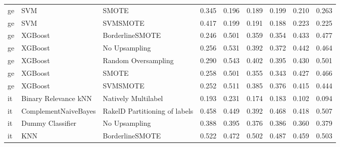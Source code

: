 \begin{tabular}{lllllllll}
      ge &                             SVM &                         SMOTE & 0.345 &                     0.196 &                 0.189 &                  0.199 &                                   0.210 &     0.263 \\
      ge &                             SVM &                      SVMSMOTE & 0.417 &                     0.199 &                 0.191 &                  0.188 &                                   0.223 &     0.225 \\
      ge &                         XGBoost &               BorderlineSMOTE & 0.246 &                     0.501 &                 0.359 &                  0.354 &                                   0.433 &     0.477 \\
      ge &                         XGBoost &                 No Upsampling & 0.256 &                     0.531 &                 0.392 &                  0.372 &                                   0.442 &     0.464 \\
      ge &                         XGBoost &           Random Oversampling & 0.290 &                     0.543 &                 0.402 &                  0.395 &                                   0.430 &     0.501 \\
      ge &                         XGBoost &                         SMOTE & 0.258 &                     0.501 &                 0.355 &                  0.343 &                                   0.427 &     0.466 \\
      ge &                         XGBoost &                      SVMSMOTE & 0.252 &                     0.511 &                 0.385 &                  0.376 &                                   0.415 &     0.444 \\
      it &            Binary Relevance kNN &           Natively Multilabel & 0.193 &                     0.231 &                 0.174 &                  0.183 &                                   0.102 &     0.094 \\
      it &            ComplementNaiveBayes & RakelD Partitioning of labels & 0.458 &                     0.449 &                 0.392 &                  0.468 &                                   0.418 &     0.507 \\
      it &                Dummy Classifier &                 No Upsampling & 0.388 &                     0.395 &                 0.376 &                  0.386 &                                   0.360 &     0.379 \\
      it &                             KNN &               BorderlineSMOTE & 0.522 &                     0.472 &                 0.502 &                  0.487 &                                   0.459 &     0.503 \\

\end{tabular}
